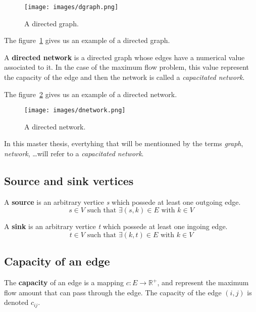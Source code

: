 \begin{figure}
\centering
\texttt{[image: images/dgraph.png]}
\caption{A directed graph.}
\label{img:dgraph}
\end{figure}

The figure~\ref{img:dgraph} gives us an example of a directed graph.

\begin{definition}
\label{dnetwork}
A \textbf{directed network} is a directed graph whose edges have a numerical value associated to it. In the case of the maximum flow problem, this value represent the capacity of the edge and then the network is called a \textit{capacitated network}.
\end{definition}

The figure~\ref{img:dnetwork} gives us an example of a directed network. \\

\begin{figure}
\centering
\texttt{[image: images/dnetwork.png]}
\caption{A directed network.}
\label{img:dnetwork}
\end{figure}



In this master thesis, evertyhing that will be mentionned by the terms \textit{graph}, \textit{network}, \dots will refer to a \textit{capacitated network}.


\subsection{Source and sink vertices}
\begin{definition}
\label{source}
A \textbf{source} is an arbitrary vertice \textit{s} which possede at least one outgoing edge.
$$s \in V \text{ such that } \exists (s, k) \in E \text{ with } k \in V$$
\end{definition}

\begin{definition}
\label{sink}
A \textbf{sink} is an arbitrary vertice \textit{t} which possede at least one ingoing edge. 
$$t \in V \text{ such that } \exists (k, t) \in E \text{ with } k \in V$$
\end{definition}

\subsection{Capacity of an edge}
\begin{definition}
\label{cedge}
The \textbf{capacity} of an edge is a mapping $c: E \to \mathbb{R}^{+}$, and represent the maximum flow amount that can pass through the edge. The capacity of the edge $(i, j)$ is denoted $c_{ij}$.
\end{definition}


